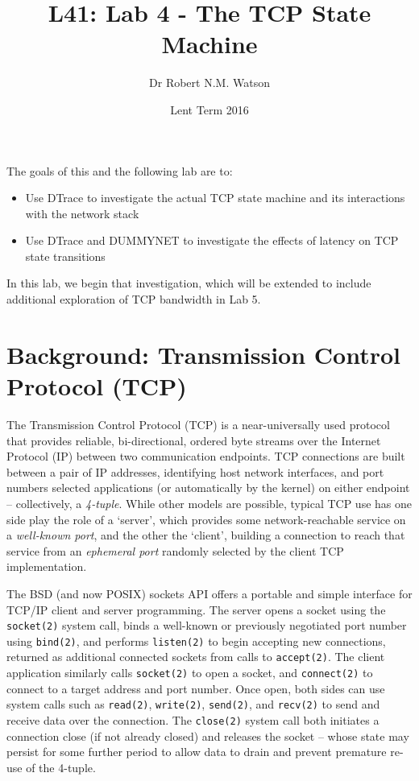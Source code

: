 \documentclass[a4paper,10pt]{article}
\begin{document}
\title{L41: Lab 4 - The TCP State Machine}
\author{Dr Robert N.M. Watson}
\date{Lent Term 2016}
\maketitle

\noindent
The goals of this and the following lab are to:

\begin{itemize}
\item Use DTrace to investigate the actual TCP state machine and its
  interactions with the network stack
\item Use DTrace and DUMMYNET to investigate the effects of latency on TCP
  state transitions
\end{itemize}

\noindent
In this lab, we begin that investigation, which will be extended to include
additional exploration of TCP bandwidth in Lab 5.

\section*{Background: Transmission Control Protocol (TCP)}

The Transmission Control Protocol (TCP) is a near-universally used protocol
that provides reliable, bi-directional, ordered byte streams over the Internet
Protocol (IP) between two communication endpoints.
TCP connections are built between a pair of IP addresses, identifying host
network interfaces, and port numbers selected applications (or automatically
by the kernel) on either endpoint -- collectively, a \textit{4-tuple}.
While other models are possible, typical TCP use has one side play the role of
a `server', which provides some network-reachable service on a
\textit{well-known port}, and the other the `client', building a connection to
reach that service from an \textit{ephemeral port} randomly selected by the
client TCP implementation.

The BSD (and now POSIX) sockets API offers a portable and simple interface for
TCP/IP client and server programming.
The server opens a socket using the \texttt{socket(2)} system call, binds a
well-known or previously negotiated port number using \texttt{bind(2)}, and
performs \texttt{listen(2)} to begin accepting new connections, returned as
additional connected sockets from calls to \texttt{accept(2)}.
The client application similarly calls \texttt{socket(2)} to open a socket,
and \texttt{connect(2)} to connect to a target address and port number.
Once open, both sides can use system calls such as \texttt{read(2)},
\texttt{write(2)}, \texttt{send(2)}, and \texttt{recv(2)} to send and receive
data over the connection.
The \texttt{close(2)} system call both initiates a connection close (if not
already closed) and releases the socket -- whose state may persist for some
further period to allow data to drain and prevent premature re-use of the
4-tuple.
\end{document}
